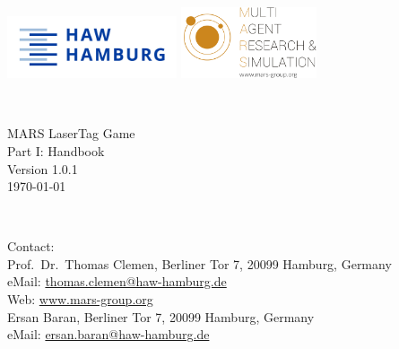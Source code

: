 \documentclass[a4paper,english,DIV=16,11pt,parskip=half,dvipsnames,listof=totoc,index=totoc,bibliography=totoc]{scrartcl}
\begin{document}
\begin{titlepage}

\begin{minipage}{\textwidth}
\noindent
\includegraphics[width=5cm]{./logos/HAW_Hamburg.jpeg}
\hfill
\includegraphics[width=4cm]{./logos/mars_logo.png}
\end{minipage}\\

\vspace{5cm}

\begin{minipage}{\textwidth}
\noindent
\centering
{\huge MARS LaserTag Game}\\[0.5cm]
{\LARGE Part I: Handbook}\\[0.5cm]
{\large \textsf{Version 1.0.1}}\\
{\large \textsf{\today}}

\end{minipage}\\


\vfill

\begin{framed}
	\begin{minipage}{\textwidth}
		Contact:\\[2ex]  
        Prof.~Dr.~Thomas Clemen, Berliner Tor 7, 20099 Hamburg, Germany\\
		eMail: \href{mailto:thomas.clemen@haw-hamburg.de}{thomas.clemen@haw-hamburg.de}\\
		Web: \url{www.mars-group.org}\\[2ex] 

        Ersan Baran, Berliner Tor 7, 20099 Hamburg, Germany\\
        eMail: \href{mailto:ersan.baran@haw-hamburg.de}{ersan.baran@haw-hamburg.de}\\
	\end{minipage}

\end{framed}

\end{titlepage}
\end{document}

